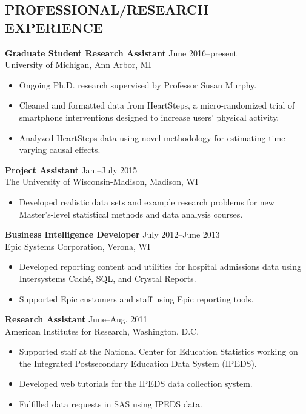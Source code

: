 \documentclass[line]{res}
\begin{document}
\begin{resume}
\section{PROFESSIONAL/RESEARCH EXPERIENCE}
{\bf Graduate Student Research Assistant} \hfill June 2016--present\\
University of Michigan, Ann Arbor, MI
\begin{itemize}
\item Ongoing Ph.D. research supervised by Professor Susan Murphy.
\item Cleaned and formatted data from HeartSteps, a micro-randomized trial of smartphone interventions designed to increase users' physical activity.
\item Analyzed HeartSteps data using novel methodology for estimating time-varying causal effects.
\end{itemize}
{\bf Project Assistant} \hfill Jan.--July 2015\\
The University of Wisconsin-Madison, Madison, WI
\begin{itemize}
\item Developed realistic data sets and example research problems for new Master's-level
  statistical methods and data analysis courses.
\end{itemize}
{\bf Business Intelligence Developer} \hfill July 2012--June
2013\\
Epic Systems Corporation, Verona, WI
\begin{itemize}
\item  Developed reporting content and utilities for hospital
  admissions data using Intersystems
  Cach\'{e}, SQL, and Crystal Reports.
\item Supported Epic customers and
  staff using Epic reporting tools.
\end{itemize}
{\bf Research Assistant}  \hfill June--Aug. 2011\\
American Institutes for Research, Washington, D.C.
\begin{itemize}
\item    Supported staff at the National Center for Education Statistics
   working on the Integrated Postsecondary Education Data System
   (IPEDS).
 \item Developed web tutorials for the IPEDS data collection
   system.
 \item Fulfilled data requests in SAS using IPEDS data.
\end{itemize}


\end{resume}
\end{document}
